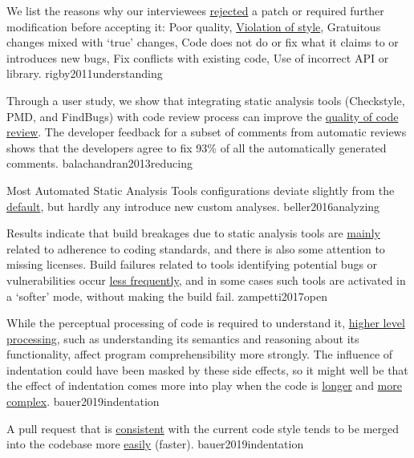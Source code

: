 \documentclass{article}
\begin{document}
  {We list the reasons why our interviewees \ul{rejected} a patch or required further modification before accepting it:
    Poor quality,
    \ul{Violation of style},
    Gratuitous changes mixed with `true' changes,
    Code does not do or fix what it claims to or introduces new bugs,
    Fix conflicts with existing code,
    Use of incorrect API or library.}
  {rigby2011understanding}

  {Through a user study, we show that integrating static analysis tools (Checkstyle, PMD, and FindBugs) with code review process can improve the \ul{quality of code review}. The developer feedback for a subset of comments from automatic reviews shows that the developers agree to fix 93\% of all the automatically generated comments.}
  {balachandran2013reducing}

  {Most Automated Static Analysis Tools configurations deviate slightly from the \ul{default}, but hardly any introduce new custom analyses. }
  {beller2016analyzing}

  {Results indicate that build breakages due to static analysis tools are \ul{mainly} related to adherence to coding standards, and there is also some attention to missing licenses. Build failures related to tools identifying potential bugs or vulnerabilities occur \ul{less frequently}, and in some cases such tools are activated in a `softer' mode, without making the build fail.}
  {zampetti2017open}

  {While the perceptual processing of code is required to understand it, \ul{higher level processing}, such as understanding its semantics and reasoning about its functionality, affect program comprehensibility more strongly. The influence of indentation could have been masked by these side effects, so it might well be that the effect of indentation comes more into play when the code is \ul{longer} and \ul{more complex}.}
  {bauer2019indentation}

  {A pull request that is \ul{consistent} with the current code style tends to be merged into the codebase more \ul{easily} (faster).}
  {bauer2019indentation}
\end{document}
